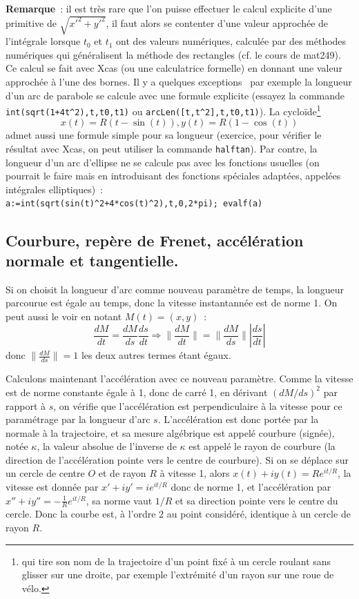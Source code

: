 \documentclass[a4paper,11pt]{article}
\begin{document}
{\bf Remarque}~: il est très rare que l'on puisse effectuer
le calcul explicite d'une primitive de $\sqrt{x'^2+y'^2}$,
il faut alors se contenter d'une valeur approchée de l'intégrale
lorsque $t_0$ et $t_1$ ont des valeurs numériques, calculée
par des méthodes numériques qui généralisent la méthode
des rectangles (cf. le cours de mat249).
Ce calcul se fait avec Xcas (ou une calculatrice formelle) en donnant
une valeur approchée à l'une des bornes.
Il y a quelques exceptions~ par exemple la longueur d'un arc de 
parabole se calcule avec une formule explicite (essayez la
commande \verb|int(sqrt(1+4t^2),t,t0,t1)| ou
\verb|arcLen([t,t^2],t,t0,t1)|). La 
cyclo\"ide\footnote{qui tire
son nom de la trajectoire d'un point fix\'e \`a un cercle roulant
sans glisser sur une droite, par exemple l'extr\'emit\'e d'un rayon 
sur une roue de v\'elo.} 
$$ x(t)=R(t-\sin(t)), y(t)=R(1-\cos(t))$$
admet aussi une formule simple pour sa longueur (exercice, pour
v\'erifier le r\'esultat avec Xcas, on peut utiliser 
la commande \verb|halftan|).
Par contre, la
longueur d'un arc d'ellipse ne se calcule pas avec les fonctions
usuelles (on pourrait le faire mais en introduisant des fonctions spéciales
adaptées, appel\'ees int\'egrales elliptiques)~:\\
\verb|a:=int(sqrt(sin(t)^2+4*cos(t)^2),t,0,2*pi); evalf(a)|


\subsection{Courbure, rep\`ere de Frenet, accélération normale et
  tangentielle.} \label{sec:courbure}
Si on choisit la longueur d'arc comme nouveau paramètre de temps, 
la longueur parcourue est égale au temps, donc la vitesse instantannée
est de norme 1. On peut aussi le voir en notant $M(t)=(x,y)$~:
$$ \frac{dM}{dt} =\frac{dM}{ds} \frac{ds}{dt} 
\Rightarrow \| \frac{dM}{dt} \| = \| \frac{dM}{ds} \| |\frac{ds}{dt}|$$
donc $\| \frac{dM}{ds} \|=1$ les deux autres termes étant égaux.

Calculons maintenant l'accélération avec ce nouveau paramètre. Comme
la vitesse est de norme constante égale à 1, donc de carré 1, 
en dérivant $(dM/ds)^2$ par rapport \`a $s$,
on v\'erifie que l'accélération est perpendiculaire à la vitesse
pour ce paramétrage par la longueur d'arc $s$. 
L'acc\'el\'eration est donc portée par la normale à la trajectoire,
et sa mesure alg\'ebrique est appelé courbure (sign\'ee), not\'ee $\kappa$,
la valeur absolue de l'inverse de $\kappa$ est appel\'e le rayon de courbure
(la direction de l'accélération pointe vers le centre
de courbure). Si on se déplace sur un cercle de centre $O$
et de rayon $R$ à vitesse 1, alors $x(t)+iy(t)=Re^{it/R}$, la vitesse
est donnée par $x'+iy'=ie^{it/R}$ donc de norme 1, et l'accélération
par $x''+iy''=-\frac1R e^{it/R}$, sa norme vaut $1/R$ et sa direction
pointe vers le centre du cercle. Donc la courbe est, 
à l'ordre 2 au point considéré, identique à un cercle de rayon $R$.
\end{document}

